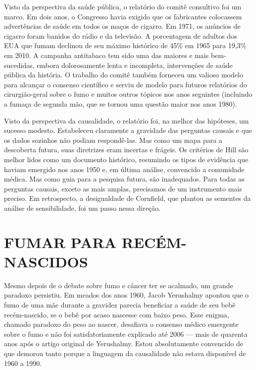 \documentclass[11pt,a5paper,twoside]{book}
\begin{document}
Visto da perspectiva da saúde pública, o relatório do comitê consultivo foi um marco. Em dois anos, o Congresso havia exigido que os fabricantes colocassem advertências de saúde em todos os maços de cigarro. Em 1971, os anúncios de cigarro foram banidos do rádio e da televisão. A porcentagem de adultos dos EUA que fumam declinou de seu máximo histórico de 45\% em 1965 para 19,3\% em 2010. A campanha antitabaco tem sido uma das maiores e mais bem-sucedidas, embora dolorosamente lenta e incompleta, intervenções de saúde pública da história. O trabalho do comitê também forneceu um valioso modelo para alcançar o consenso científico e serviu de modelo para futuros relatórios do cirurgião-geral sobre o fumo e muitos outros tópicos nos anos seguintes (incluindo a fumaça de segunda mão, que se tornou uma questão maior nos anos 1980).

Visto da perspectiva da causalidade, o relatório foi, na melhor das hipóteses, um sucesso modesto. Estabeleceu claramente a gravidade das perguntas causais e que os dados sozinhos não podiam respondê-las. Mas como um mapa para a descoberta futura, suas diretrizes eram incertas e frágeis. Os critérios de Hill são melhor lidos como um documento histórico, resumindo os tipos de evidência que haviam emergido nos anos 1950 e, em última análise, convencido a comunidade médica. Mas como guia para a pesquisa futura, são inadequados. Para todas as perguntas causais, exceto as mais amplas, precisamos de um instrumento mais preciso. Em retrospecto, a desigualdade de Cornfield, que plantou as sementes da análise de sensibilidade, foi um passo nessa direção.

\section{FUMAR PARA RECÉM-NASCIDOS}
Mesmo depois de o debate sobre fumo e câncer ter se acalmado, um grande paradoxo persistiu. Em meados dos anos 1960, Jacob Yerushalmy apontou que o fumo de uma mãe durante a gravidez parecia beneficiar a saúde de seu bebê recém-nascido, se o bebê por acaso nascesse com baixo peso. Esse enigma, chamado paradoxo do peso ao nascer, desafiava o consenso médico emergente sobre o fumo e não foi satisfatoriamente explicado até 2006 — mais de quarenta anos após o artigo original de Yerushalmy. Estou absolutamente convencido de que demorou tanto porque a linguagem da causalidade não estava disponível de 1960 a 1990.
\end{document}
